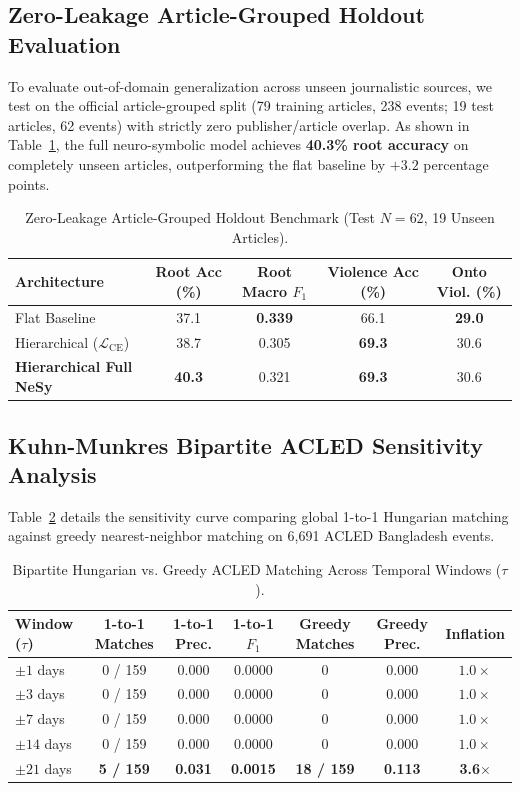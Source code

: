 \documentclass[11pt,a4paper]{article}
\begin{document}
\subsection{Zero-Leakage Article-Grouped Holdout Evaluation}
To evaluate out-of-domain generalization across unseen journalistic sources, we test on the official article-grouped split (79 training articles, 238 events; 19 test articles, 62 events) with strictly zero publisher/article overlap. As shown in Table~\ref{tab:article_holdout}, the full neuro-symbolic model achieves \textbf{40.3\% root accuracy} on completely unseen articles, outperforming the flat baseline by $+3.2$ percentage points.

\begin{table}[ht]
\centering
\small
\caption{Zero-Leakage Article-Grouped Holdout Benchmark (Test $N=62$, 19 Unseen Articles).}
\label{tab:article_holdout}
\begin{tabular}{lcccc}
\toprule
\textbf{Architecture} & \textbf{Root Acc (\%)} & \textbf{Root Macro $F_1$} & \textbf{Violence Acc (\%)} & \textbf{Onto Viol. (\%)} \\
\midrule
Flat Baseline & 37.1 & \textbf{0.339} & 66.1 & \textbf{29.0} \\
Hierarchical ($\mathcal{L}_{\text{CE}}$) & 38.7 & 0.305 & \textbf{69.3} & 30.6 \\
\textbf{Hierarchical Full NeSy} & \textbf{40.3} & 0.321 & \textbf{69.3} & 30.6 \\
\bottomrule
\end{tabular}
\end{table}

\subsection{Kuhn-Munkres Bipartite ACLED Sensitivity Analysis}
Table~\ref{tab:acled_curve} details the sensitivity curve comparing global 1-to-1 Hungarian matching against greedy nearest-neighbor matching on 6,691 ACLED Bangladesh events.

\begin{table}[ht]
\centering
\small
\caption{Bipartite Hungarian vs. Greedy ACLED Matching Across Temporal Windows ($\tau$).}
\label{tab:acled_curve}
\begin{tabular}{lcccccc}
\toprule
\textbf{Window ($\tau$)} & \textbf{1-to-1 Matches} & \textbf{1-to-1 Prec.} & \textbf{1-to-1 $F_1$} & \textbf{Greedy Matches} & \textbf{Greedy Prec.} & \textbf{Inflation} \\
\midrule
$\pm 1$ days  & 0 / 159 & 0.000 & 0.0000 & 0 & 0.000 & $1.0\times$ \\
$\pm 3$ days  & 0 / 159 & 0.000 & 0.0000 & 0 & 0.000 & $1.0\times$ \\
$\pm 7$ days  & 0 / 159 & 0.000 & 0.0000 & 0 & 0.000 & $1.0\times$ \\
$\pm 14$ days & 0 / 159 & 0.000 & 0.0000 & 0 & 0.000 & $1.0\times$ \\
$\pm 21$ days & \textbf{5 / 159} & \textbf{0.031} & \textbf{0.0015} & \textbf{18 / 159} & \textbf{0.113} & \textbf{3.6$\times$} \\
\bottomrule
\end{tabular}
\end{table}
\end{document}
